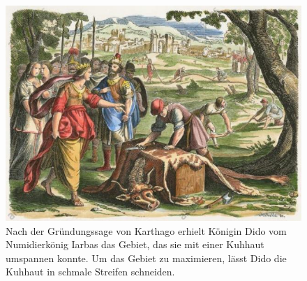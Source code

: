 %
%
%
\begin{figure}
\includegraphics[width=\textwidth]{chapters/050-nebenbedingungen/images/dido.jpg}
\caption{Nach der Gründungssage von Karthago erhielt Königin Dido
vom Numidierkönig Iarbas das Gebiet, das sie mit einer Kuhhaut umspannen
konnte.
Um das Gebiet zu maximieren, lässt Dido die Kuhhaut in schmale Streifen
schneiden.
\label{buch:nebenbedingungen:lagrangemult:fig:dido2}}
\end{figure}

